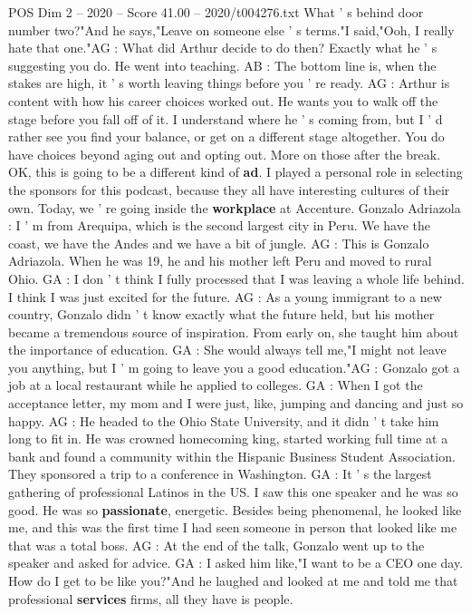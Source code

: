 \begin{textsample}{POS Dim 2 – 2020 – Score 41.00 – 2020/t004276.txt}
What ' s behind door number two?"And he says,"Leave on someone else ' s terms."I said,"Ooh, I really hate that one."AG : What did Arthur decide to do then?
Exactly what he ' s suggesting you do.
He went into teaching.
AB : The bottom line is, when the stakes are high, it ' s worth leaving things before you ' re ready.
AG : Arthur is content with how his career choices worked out.
He wants you to walk off the stage before you fall off of it.
I understand where he ' s coming from, but I ' d rather see you find your balance, or get on a different stage altogether.
You do have choices beyond aging out and opting out.
More on those after the break.
OK, this is going to be a different kind of \textbf{ad}.
I played a personal role in selecting the sponsors for this podcast, because they all have interesting cultures of their own.
Today, we ' re going inside the \textbf{workplace} at Accenture.
Gonzalo Adriazola : I ' m from Arequipa, which is the second largest city in Peru.
We have the coast, we have the Andes and we have a bit of jungle.
AG : This is Gonzalo Adriazola.
When he was 19, he and his mother left Peru and moved to rural Ohio.
GA : I don ' t think I fully processed that I was leaving a whole life behind.
I think I was just excited for the future.
AG : As a young immigrant to a new country, Gonzalo didn ' t know exactly what the future held, but his mother became a tremendous source of inspiration.
From early on, she taught him about the importance of education.
GA : She would always tell me,"I might not leave you anything, but I ' m going to leave you a good education."AG : Gonzalo got a job at a local restaurant while he applied to colleges.
GA : When I got the acceptance letter, my mom and I were just, like, jumping and dancing and just so happy.
AG : He headed to the Ohio State University, and it didn ' t take him long to fit in.
He was crowned homecoming king, started working full time at a bank and found a community within the Hispanic Business Student Association.
They sponsored a trip to a conference in Washington.
GA : It ' s the largest gathering of professional Latinos in the US.
I saw this one speaker and he was so good.
He was so \textbf{passionate}, energetic.
Besides being phenomenal, he looked like me, and this was the first time I had seen someone in person that looked like me that was a total boss.
AG : At the end of the talk, Gonzalo went up to the speaker and asked for advice.
GA : I asked him like,"I want to be a CEO one day.
How do I get to be like you?"And he laughed and looked at me and told me that professional \textbf{services} firms, all they have is people.

\end{textsample}
